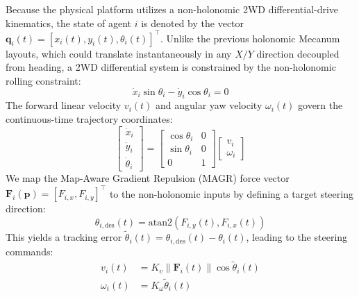 \documentclass[journal,twoside]{IEEEtran}
\newcommand{\norm}[1]{\left\lVert#1\right\rVert}
\begin{document}
Because the physical platform utilizes a non-holonomic 2WD differential-drive kinematics, the state of agent $i$ is denoted by the vector $\mathbf{q}_i(t) = [x_i(t), y_i(t), \theta_i(t)]^\top$. Unlike the previous holonomic Mecanum layouts, which could translate instantaneously in any $X/Y$ direction decoupled from heading, a 2WD differential system is constrained by the non-holonomic rolling constraint:
\begin{equation}
    \dot{x}_i \sin\theta_i - \dot{y}_i \cos\theta_i = 0
\end{equation}
The forward linear velocity $v_i(t)$ and angular yaw velocity $\omega_i(t)$ govern the continuous-time trajectory coordinates:
\begin{equation}
    \begin{bmatrix} \dot{x}_i \\ \dot{y}_i \\ \dot{\theta}_i \end{bmatrix} = \begin{bmatrix} \cos\theta_i & 0 \\ \sin\theta_i & 0 \\ 0 & 1 \end{bmatrix} \begin{bmatrix} v_i \\ \omega_i \end{bmatrix}
\end{equation}
We map the Map-Aware Gradient Repulsion (MAGR) force vector $\mathbf{F}_{i}(\mathbf{p}) = [F_{i,x}, F_{i,y}]^\top$ to the non-holonomic inputs by defining a target steering direction:
\begin{equation}
    \theta_{i,\text{des}}(t) = \text{atan2}\left(F_{i,y}(t), F_{i,x}(t)\right)
\end{equation}
This yields a tracking error $\tilde{\theta}_i(t) = \theta_{i,\text{des}}(t) - \theta_i(t)$, leading to the steering commands:
\begin{align}
    v_i(t) &= K_v \norm{\mathbf{F}_i(t)}\cos\tilde{\theta}_i(t) \\
    \omega_i(t) &= K_\omega \tilde{\theta}_i(t)
\end{align}
\end{document}
